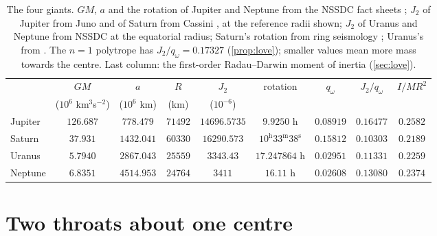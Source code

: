 \documentclass[11pt]{article}
\theoremstyle{definition}\newtheorem{definition}[theorem]{Definition}
\theoremstyle{remark}\newtheorem{remark}[theorem]{Remark}
\begin{document}
\begin{table}[!htb]\centering\small\setlength{\tabcolsep}{4pt}
\begin{tabular}{@{}lcccccccc@{}}\toprule
 & $GM$ & $a$ & $R$ & $J_2$ & rotation & $q_\omega$ & $J_2/q_\omega$ & $I/MR^2$\\
 & ($10^6$ km$^3$s$^{-2}$) & ($10^6$ km) & (km) & ($10^{-6}$) & & & & \\\midrule
Jupiter & $126.687$ & $778.479$ & $71492$ & $14696.5735$ & $9.9250$ h & $0.08919$ & $0.16477$ & $0.2582$\\
Saturn & $37.931$ & $1432.041$ & $60330$ & $16290.573$ & $10^\mathrm{h}33^\mathrm{m}38^\mathrm{s}$ & $0.15812$ & $0.10303$ & $0.2189$\\
Uranus & $5.7940$ & $2867.043$ & $25559$ & $3343.43$ & $17.247864$ h & $0.02951$ & $0.11331$ & $0.2259$\\
Neptune & $6.8351$ & $4514.953$ & $24764$ & $3411$ & $16.11$ h & $0.02608$ & $0.13080$ & $0.2374$\\\bottomrule
\end{tabular}
\caption{The four giants. $GM$, $a$ and the rotation of Jupiter and Neptune from the NSSDC fact sheets \cite{NSSDCJ,NSSDCS,NSSDCU,NSSDCN}; $J_2$ of Jupiter from Juno \cite{Durante2020} and of Saturn from Cassini \cite{Iess}, at the reference radii shown; $J_2$ of Uranus and Neptune from NSSDC at the equatorial radius; Saturn's rotation from ring seismology \cite{Mankovich2019}; Uranus's from \cite{Lamy}. The $n=1$ polytrope has $J_2/q_\omega=0.17327$ (\cref{prop:love}); smaller values mean more mass towards the centre. Last column: the first-order Radau--Darwin moment of inertia (\cref{sec:love}).}\label{tab:giants}
\end{table}

\section{Two throats about one centre}\label{sec:throats}
\end{document}
